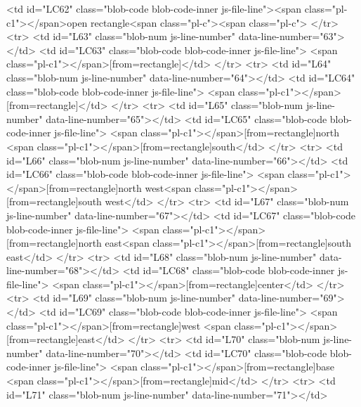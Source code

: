         <td id="LC62" class="blob-code blob-code-inner js-file-line"><span class="pl-c1">\pgfdeclareshape</span>{open rectangle}{<span class="pl-c"><span class="pl-c">%
      </tr>
      <tr>
        <td id="L63" class="blob-num js-line-number" data-line-number="63"></td>
        <td id="LC63" class="blob-code blob-code-inner js-file-line">  <span class="pl-c1">\inheritsavedanchors</span>[from=rectangle]</td>
      </tr>
      <tr>
        <td id="L64" class="blob-num js-line-number" data-line-number="64"></td>
        <td id="LC64" class="blob-code blob-code-inner js-file-line">  <span class="pl-c1">\inheritanchorborder</span>[from=rectangle]</td>
      </tr>
      <tr>
        <td id="L65" class="blob-num js-line-number" data-line-number="65"></td>
        <td id="LC65" class="blob-code blob-code-inner js-file-line">  <span class="pl-c1">\inheritanchor</span>[from=rectangle]{north}     <span class="pl-c1">\inheritanchor</span>[from=rectangle]{south}</td>
      </tr>
      <tr>
        <td id="L66" class="blob-num js-line-number" data-line-number="66"></td>
        <td id="LC66" class="blob-code blob-code-inner js-file-line">  <span class="pl-c1">\inheritanchor</span>[from=rectangle]{north west}<span class="pl-c1">\inheritanchor</span>[from=rectangle]{south west}</td>
      </tr>
      <tr>
        <td id="L67" class="blob-num js-line-number" data-line-number="67"></td>
        <td id="LC67" class="blob-code blob-code-inner js-file-line">  <span class="pl-c1">\inheritanchor</span>[from=rectangle]{north east}<span class="pl-c1">\inheritanchor</span>[from=rectangle]{south east}</td>
      </tr>
      <tr>
        <td id="L68" class="blob-num js-line-number" data-line-number="68"></td>
        <td id="LC68" class="blob-code blob-code-inner js-file-line">  <span class="pl-c1">\inheritanchor</span>[from=rectangle]{center}</td>
      </tr>
      <tr>
        <td id="L69" class="blob-num js-line-number" data-line-number="69"></td>
        <td id="LC69" class="blob-code blob-code-inner js-file-line">  <span class="pl-c1">\inheritanchor</span>[from=rectangle]{west}      <span class="pl-c1">\inheritanchor</span>[from=rectangle]{east}</td>
      </tr>
      <tr>
        <td id="L70" class="blob-num js-line-number" data-line-number="70"></td>
        <td id="LC70" class="blob-code blob-code-inner js-file-line">  <span class="pl-c1">\inheritanchor</span>[from=rectangle]{base}      <span class="pl-c1">\inheritanchor</span>[from=rectangle]{mid}</td>
      </tr>
      <tr>
        <td id="L71" class="blob-num js-line-number" data-line-number="71"></td>
}
